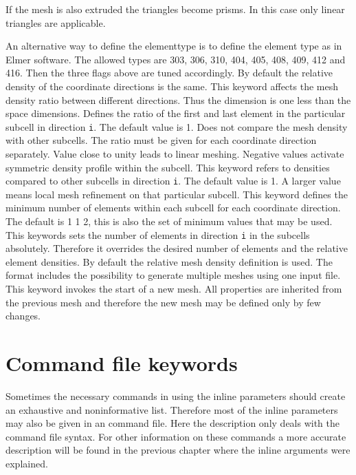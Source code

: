 If the mesh is also extruded the triangles become prisms. In this case
only linear triangles are applicable.


An alternative way to define the elementtype is to define the 
element type as in Elmer software.
The allowed types are 303, 306, 310, 404, 405, 408, 409,
412 and 416. Then the three flags above are tuned accordingly.
%
By default the relative density of the coordinate 
directions is the same. This keyword affects the 
mesh density ratio between different directions.
Thus the dimension is one less than the space dimensions.
%
Defines the ratio of the first and last element in the particular
subcell in direction \texttt{i}. The default value is 1.
Does not compare the mesh density with other subcells.
The ratio must be given for each coordinate direction 
separately. Value close to unity leads to linear meshing.
Negative values activate symmetric density profile within the subcell. 
%
This keyword refers 
to densities compared to other subcells in direction \texttt{i}.
The default value is 1. A larger value means local 
mesh refinement on that particular subcell.
%
This keyword defines the minimum number of elements 
within each subcell for each coordinate direction.
The default is 1 1 2, this is also the set of minimum values
that may be used.
%
This keywords sets the number of elements in direction \texttt{i} in the subcells
absolutely. Therefore it overrides the desired number of elements
and the relative element densities. By default the relative 
mesh density definition is used. 
%
The format includes the possibility to generate multiple
meshes using one input file. This keyword invokes the 
start of a new mesh. All properties are inherited from the 
previous mesh and therefore the new mesh may be 
defined only by few changes.
\sifend



\section{Command file keywords}

Sometimes the necessary commands in using the inline parameters
should create an exhaustive and noninformative list. Therefore most of the
inline parameters may also be given in an command file.
Here the description only deals with the command file
syntax. For other information on these commands a more accurate description will 
be found in the previous chapter where the inline arguments were explained.

